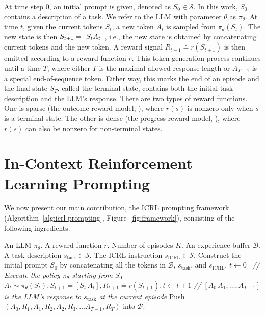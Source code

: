 \documentclass{article} %
\newcommand{\fS}{\mathcal{S}}
\newcommand{\fB}{\mathcal{B}}
\newcommand{\0}{\mathbf{0}}
\newcommand{\icrl}{\text{ICRL}}
\begin{document}
At time step 0, an initial prompt is given, denoted as $S_0 \in \fS$.
In this work,
$S_0$ contains a description of a task.
We refer to the LLM with parameter $\theta$ as $\pi_\theta$.
At time $t$,
given the current tokens $S_t$,
a new token $A_t$ is sampled from $\pi_\theta(S_t)$.
The new state is then $S_{t+1} = \mqty[S_t A_t]$, i.e.,
the new state is obtained by concatenating current tokens and the new token.
A reward signal $R_{t+1} \doteq r(S_{t+1})$ is then emitted according to a reward function $r$.
This token generation process continues until a time $T$,
where either $T$ is the maximal allowed response length or $A_{T-1}$ is a special end-of-sequence token.
Either way,
this marks the end of an episode
and the final state $S_T$, called the terminal state, contains both the initial task description and the LLM's response.
There are two types of reward functions.
One is sparse (the outcome reward model, \citet{ouyang2022training}),
where $r(s)$ is nonzero only when $s$ is a terminal state.
The other is dense (the progress reward model, \citet{lightman2023lets}),
where $r(s)$ can also be nonzero for non-terminal states.



\section{In-Context Reinforcement Learning Prompting}

We now present our main contribution,
the ICRL prompting framework (Algorithm~\ref{alg:icrl prompting}, Figure~\ref{fig:framework}),
consisting of the following ingredients. 
\begin{algorithm}[h]
  \caption{ICRL Prompting}\label{alg:icrl prompting}
  \begin{algorithmic}[1]
    \REQUIRE An LLM $\pi_\theta$. A reward function $r$. Number of episodes $K$. An experience buffer $\fB$. \\ A task description $s_\text{task} \in \fS$. 
    The ICRL instruction $s_\icrl \in \fS$. 
      \STATE Construct the initial prompt $S_0$ by concatenating all the tokens in $\fB$, $s_\text{task}$, and $s_\icrl$.
      \STATE $t \gets 0$  \, \emph{// Execute the policy $\pi_\theta$ starting from $S_0$}
      \STATE $A_t \sim \pi_\theta(S_t), S_{t+1} \doteq [S_t \, A_t], R_{t+1} \doteq r(S_{t+1}), t \gets t+1$
      \ENDWHILE
      \STATE \emph{// $[A_0\, A_1,\dots, A_{T-1}]$ is the LLM's response to $s_\text{task}$ at the current episode} 
      \STATE Push $(A_0, R_1, A_1, R_2, A_2, R_3, \dots A_{T-1}, R_T)$ into $\fB$.
    \ENDFOR
  \end{algorithmic}
  \end{algorithm}
\end{document}
